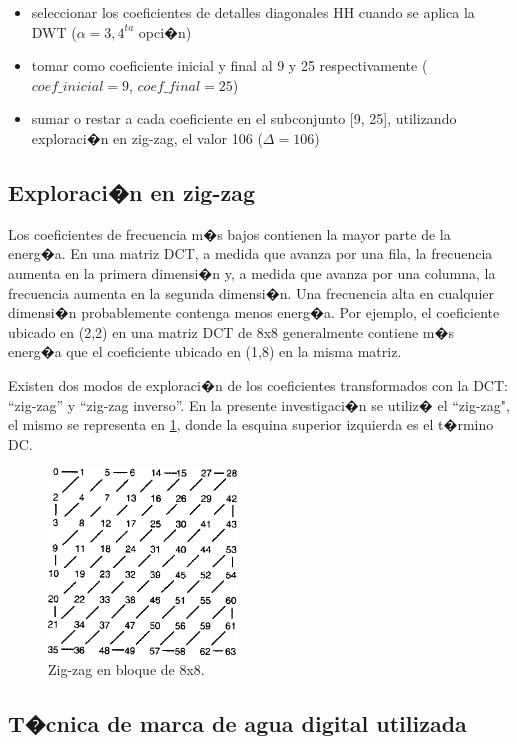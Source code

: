 \documentclass{rcci} %
\begin{document}
\begin{itemize}
	\item seleccionar los coeficientes de detalles diagonales HH cuando se aplica la DWT ($\alpha=3, 4^{ta}$ opci�n)
	\item tomar como coeficiente inicial y final al 9 y 25 respectivamente ($coef\_inicial=9$, $coef\_final=25$)
	\item sumar o restar a cada coeficiente en el subconjunto [9, 25], utilizando exploraci�n en zig-zag, el valor 106 ($\Delta=106$)
\end{itemize}

\subsection{Exploraci�n en zig-zag}

Los coeficientes de frecuencia m�s bajos contienen la mayor parte de la energ�a. En una matriz DCT, a medida que avanza por una fila, la frecuencia aumenta en la primera dimensi�n y, a medida que avanza por una columna, la frecuencia aumenta en la segunda dimensi�n. Una frecuencia alta en cualquier dimensi�n probablemente contenga menos energ�a. Por ejemplo, el coeficiente ubicado en (2,2) en una matriz DCT de 8x8 generalmente contiene m�s energ�a que el coeficiente ubicado en (1,8) en la misma matriz.

Existen dos modos de exploraci�n de los coeficientes transformados con la DCT: ``zig-zag'' y ``zig-zag inverso''. En la presente investigaci�n se utiliz� el ``zig-zag", el mismo se representa en \ref{zigzagdct}, donde la esquina superior izquierda es el t�rmino DC.

\begin{figure}[H]	%
	\centering
	\includegraphics[width=5cm]{zigzagdct} %
	\caption{Zig-zag en bloque de 8x8.}
	\label{zigzagdct}
\end{figure}

\subsection{T�cnica de marca de agua digital utilizada}
\end{document}
